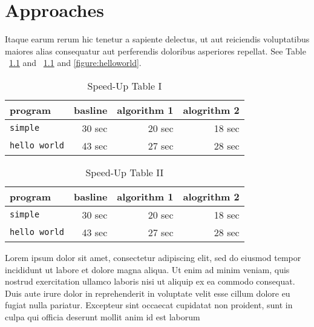 \chapter{Approaches}\label{chapter:approach} %
 Itaque earum rerum hic tenetur a sapiente delectus, ut aut reiciendis voluptatibus maiores alias consequatur aut perferendis doloribus asperiores repellat\cite{aho:dragonbook}. See Table ~\ref{table:speedup1} and ~\ref{table:speedup1} and \ref{figure:helloworld}.

\begin{table}[!th]
  \renewcommand{\arraystretch}{1.3}
  \caption{Speed-Up Table I}\label{table:speedup1}
  \vspace{4mm} %
  \centering
    \begin{tabular}{|l||r|r|r|}
      \hline      
      program            & basline   & algorithm 1  & alogrithm 2\\
      \hline      
      \hline
      {\tt simple}       &  30 sec   &  20 sec      &  18 sec     \\
      \hline
      {\tt hello world}  &  43 sec   &  27 sec      &  28 sec     \\
      \hline      
    \end{tabular}
\end{table}

\begin{table}[!th]
  \renewcommand{\arraystretch}{1.3}
  \caption{Speed-Up Table II}\label{table:speedup2}
  \vspace{4mm} %
  \centering
    \begin{tabular}{|l||r|r|r|}
      \hline      
      program            & basline   & algorithm 1  & alogrithm 2\\
      \hline      
      \hline
      {\tt simple}       &  30 sec   &  20 sec      &  18 sec     \\
      \hline
      {\tt hello world}  &  43 sec   &  27 sec      &  28 sec     \\
      \hline      
    \end{tabular}
\end{table}
Lorem ipsum dolor sit amet, consectetur adipiscing elit, sed do eiusmod tempor incididunt ut labore et dolore magna aliqua. Ut enim ad minim veniam, quis nostrud exercitation ullamco laboris nisi ut aliquip ex ea commodo consequat. Duis aute irure dolor in reprehenderit in voluptate velit esse cillum dolore eu fugiat nulla pariatur. Excepteur sint occaecat cupidatat non proident, sunt in culpa qui officia deserunt mollit anim id est laborum

